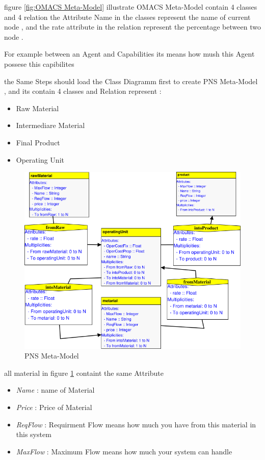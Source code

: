 figure \ref{fig:OMACS Meta-Model} illustrate OMACS Meta-Model  contain 4 classes 
and 4 relation   
the Attribute Name in the classes represent the name of current node ,
and the rate attribute in the relation represent  the percentage between two node .

For example between an Agent and Capabilities its means how mush this Agent possese this capibilites
 

the Same Steps should load the Class Diagramm first to create PNS Meta-Model , and its contain 4 classes and Relation
represent  : 
\begin{itemize}
	\item Raw Material  
	\item Intermediare Material
	\item Final Product
	\item Operating Unit
\end{itemize}

\begin{figure}[th] 

	\centering
 	\includegraphics[scale=0.7]{Chapiter3/img/pns_meta}
	\caption{\label{fig:PNS Meta-Model}PNS Meta-Model}
	
\end{figure} 

all material in figure \ref{fig:PNS Meta-Model} containt the same Attribute
\begin{itemize}


\item \textit{Name} : name of Material 
\item \textit{Price} : Price of Material
\item \textit{ReqFlow} : Requirment Flow means how much you have from this material in this system
\item \textit{MaxFlow} : Maximum Flow means how much your system can handle

\end{itemize}




